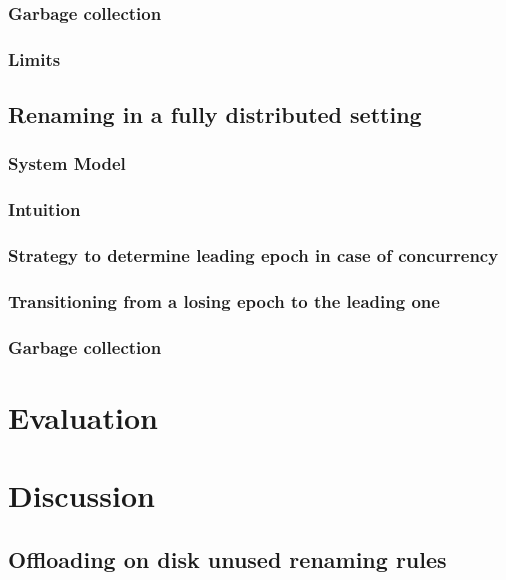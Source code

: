 \documentclass{article}
\begin{document}
\subsubsection{Garbage collection}
\subsubsection{Limits}

\subsection{Renaming in a fully distributed setting}

\subsubsection{System Model}
\subsubsection{Intuition}
\subsubsection{Strategy to determine leading epoch in case of concurrency}
\subsubsection{Transitioning from a losing epoch to the leading one}
\subsubsection{Garbage collection}

\section{Evaluation}

\section{Discussion}

\subsection{Offloading on disk unused renaming rules}
\end{document}
